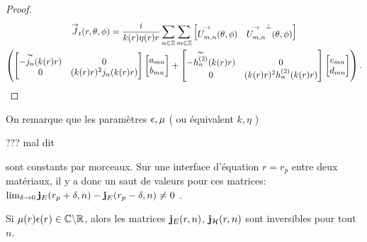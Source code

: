 \begin{proof}
\begin{multline*}
            {\overset{\rightarrow}{J}}_t(r,\theta,\phi) = \dfrac{i}{k(r)\eta(r)r}\sum_{n\in\mathbb Z}\sum_{m\in\mathbb Z}
            \begin{bmatrix}
                {\overset{\rightarrow}{U_{m,n}^{{}}}}(\theta,\phi) & {\overset{\rightarrow}{U_{m,n}^{{}}}}^\perp(\theta,\phi)
            \end{bmatrix}
            \\
            \left(
                \begin{bmatrix}
                    -\overset{\thicksim}{j_n}(k(r)r) & 0
                    \\
                    0 & (k(r)r)^2 j_n(k(r)r)
                \end{bmatrix}
                \begin{bmatrix}
                    a_{mn}
                    \\
                    b_{mn}
                \end{bmatrix}
                +
                \begin{bmatrix}
                    -\overset{\thicksim}{h^{(2)}_n}(k(r)r) & 0
                    \\                
                    0 & (k(r)r)^2 h^{(2)}_n(k(r)r)
                \end{bmatrix}
                \begin{bmatrix}
                    c_{mn}
                    \\
                    d_{mn}
                \end{bmatrix}
            \right).
        \end{multline*}
    \end{proof}

    On remarque que les paramètres \(\epsilon,\mu\) ( ou équivalent \(k,\eta\) )
\begin{REM}
  ??? mal dit
\end{REM} 
    sont constants par morceaux.
    Sur une interface d'équation \(r=r_p\) entre deux matériaux, il y a donc un saut de valeurs pour ces matrices: \(\lim_{\delta\rightarrow 0 } \mathbf{j}_E(r_p+ \delta,n) - \mathbf{j}_E(r_p - \delta,n) \not = 0\) .

    \begin{prop}
      \label{lem:sphere:imp:inv_matrices_JE-HE}
      Si \(\mu(r)\epsilon(r) \in \mathbb C\backslash\mathbb R\), alors les matrices \(\mathbf{j}_E(r,n)\), \(\mathbf{j}_{\mathcal{H}}(r,n)\)  sont inversibles pour tout \(n\).
    \end{prop}

